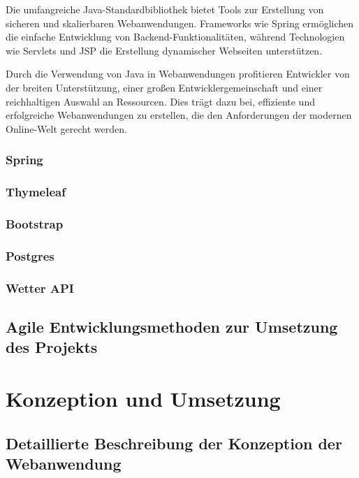 \documentclass[fontsize=12pt,openright,oneside,paper=a4,BCOR=1cm]{scrbook}
\begin{document}
Die umfangreiche Java-Standardbibliothek bietet Tools zur Erstellung von sicheren und skalierbaren Webanwendungen. Frameworks wie Spring ermöglichen die einfache Entwicklung von Backend-Funktionalitäten, während Technologien wie Servlets und JSP die Erstellung dynamischer Webseiten unterstützen.

Durch die Verwendung von Java in Webanwendungen profitieren Entwickler von der breiten Unterstützung, einer großen Entwicklergemeinschaft und einer reichhaltigen Auswahl an Ressourcen. Dies trägt dazu bei, effiziente und erfolgreiche Webanwendungen zu erstellen, die den Anforderungen der modernen Online-Welt gerecht werden.

\subsection{Spring}

\subsection{Thymeleaf}

\subsection{Bootstrap}

\subsection{Postgres}

\subsection{Wetter API}


\section{Agile Entwicklungsmethoden zur Umsetzung des Projekts}


%
%

\renewcommand{\cleardoublepage}{}
\chapter{Konzeption und Umsetzung}

\section{Detaillierte Beschreibung der Konzeption der Webanwendung}
\end{document}
